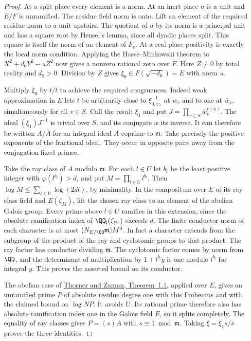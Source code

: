 \documentclass[a4paper,11pt]{article}
\theoremstyle{definition}
\theoremstyle{remark}
\numberwithin{equation}{section}
\begin{document}
\begin{proof}
At a split place every element is a norm. At an inert place \(u\)
is a unit and \(E/F\) is unramified. The residue field norm is onto.
Lift an element of the required residue norm to a unit upstairs.
The quotient of \(u\) by its norm is a principal unit and has a square
root by Hensel's lemma, since all dyadic places split. This square
is itself the norm of an element of \(F_v\). At a real place
positivity is exactly the local norm condition. Applying the
Hasse--Minkowski theorem to \(X^2+d_0Y^2-u Z^2\) now gives a
nonzero rational zero over \(F\). Here \(Z\ne0\) by total reality and
\(d_0>0\). Division by \(Z\) gives \(\xi_0\in F(\sqrt{-d_0})=E\)
with norm \(u\).

Multiply \(\xi_0\) by \(t/\bar t\) to achieve the required congruences.
Indeed weak approximation in \(E\) lets \(t\) be arbitrarily close
to \(\xi_{0,w_v}^{-1}\) at \(w_v\) and to one at \(\bar w_v\),
simultaneously for all \(v\in S\). Call the result \(\xi_1\) and put
\(J=\prod_{v\in S}\bar w_v^{v(u)}\). The ideal
\((\xi_1)J^{-1}\) is trivial over \(S\), and its conjugate is its
inverse. It can therefore be written \(A/\bar A\) for an integral
ideal \(A\) coprime to \(\mathfrak m\). Take precisely the positive
exponents of the fractional ideal. They occur in opposite pairs
away from the conjugation-fixed primes.

Take the ray class of \(A\) modulo \(\mathfrak m\). For each
\(l\in U\) let \(b_l\) be the least positive integer with
\(\varphi(l^{b_l})>d\), and put \(M=\prod_{l\in U}l^{b_l}\).
Then \(\log M\le\sum_{l\in U}\log(2dl)\), by minimality.
In the compositum over \(E\) of its ray class field and \(E(\zeta_M)\),
lift the chosen ray class to an element of the abelian Galois group.
Every prime above \(l\in U\) ramifies in this extension, since the
absolute ramification index of \(\QQ_l(\zeta_{l^{b_l}})\) exceeds
\(d\). The finite conductor norm of each character is at most
\((N_{E/\QQ}\mathfrak m)M^d\). In fact a character extends from
the subgroup of the product of the ray and cyclotomic groups to
that product. The ray factor has conductor dividing \(\mathfrak m\).
The cyclotomic factor comes by norm from \(\QQ\), and the determinant
of multiplication by \(1+l^{b_l}y\) is one modulo \(l^{b_l}\) for
integral \(y\). This proves the asserted bound on its conductor.

The abelian case of
\href{https://arxiv.org/pdf/1604.01750}{Thorner and Zaman, Theorem~1.1},
applied over \(E\), gives an unramified prime \(P\) of absolute
residue degree one with this Frobenius and with the claimed bound
on \(\log NP\). It avoids \(U\). Its rational prime therefore also
has absolute ramification index one in the Galois field \(E\), so
it splits completely. The equality of ray classes gives
\(P=(s)A\) with \(s\equiv1\bmod\mathfrak m\). Taking
\(\xi=\xi_1s/\bar s\) proves the three identities.


\end{proof}
\end{document}
